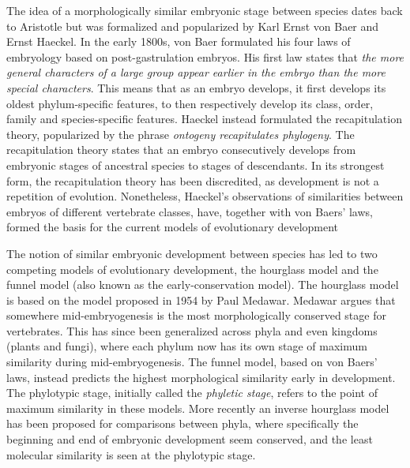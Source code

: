 The idea of a morphologically similar embryonic stage between species dates back to Aristotle\cite{Aristotle1943} but was formalized and popularized by Karl Ernst von Baer and Ernst Haeckel\cite{haeckel1866,baer1828}. In the early 1800s, von Baer formulated his four laws of embryology based on post-gastrulation embryos. His first law states that \textit{the more general characters of a large group appear earlier in the embryo than the more special characters}. This means that as an embryo develops, it first develops its oldest phylum-specific features, to then respectively develop its class, order, family and species-specific features. Haeckel instead formulated the recapitulation theory, popularized by the phrase \textit{ontogeny recapitulates phylogeny}. The recapitulation theory states that an embryo consecutively develops from embryonic stages of ancestral species to stages of descendants. In its strongest form, the recapitulation theory has been discredited, as development is not a repetition of evolution\cite{ehrlich1974}. Nonetheless, Haeckel's observations of similarities between embryos of different vertebrate classes, have, together with von Baers’ laws, formed the basis for the current models of evolutionary development

The notion of similar embryonic development between species has led to two competing models of evolutionary development, the hourglass model and the funnel model (also known as the early-conservation model). The hourglass model is based on the model proposed in 1954 by Paul Medawar\cite{Medawar1954}. Medawar argues that somewhere mid-embryogenesis is the most morphologically conserved stage for vertebrates. This has since been generalized across phyla and even kingdoms (plants\cite{Quint2012} and fungi\cite{Cheng2015}), where each phylum now has its own stage of maximum similarity during mid-embryogenesis. The funnel model, based on von Baers' laws, instead predicts the highest morphological similarity early in development. The phylotypic stage, initially called the \textit{phyletic stage}, refers to the point of maximum similarity in these models\cite{Cohen1963, Seidel1960}. More recently an inverse hourglass model has been proposed for comparisons between phyla, where specifically the beginning and end of embryonic development seem conserved, and the least molecular similarity is seen at the phylotypic stage\cite{Levin2016}.

